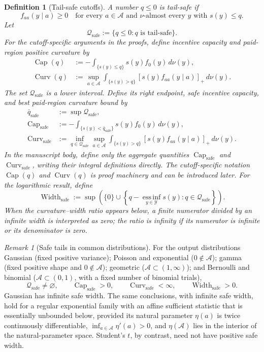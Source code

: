 \documentclass[11pt]{article}
\newtheorem{definition}{Definition}
\theoremstyle{remark}
\newtheorem{remark}{Remark}
\newcommand{\dd}{\,d\nu}
\newcommand{\cA}{\mathcal A}
\newcommand{\cY}{\mathcal Y}
\newcommand{\cQ}{\mathcal Q}
\DeclareMathOperator{\Capacity}{Cap}
\DeclareMathOperator{\Curv}{Curv}
\DeclareMathOperator{\Width}{Width}
\begin{document}
\begin{definition}[Tail-safe cutoffs]
A number $q\le0$ is \emph{tail-safe} if
\[
 f_{aa}(y\mid a)\ge0
 \quad\text{for every }a\in\cA
 \text{ and $\nu$-almost every }y\text{ with }s(y)\le q.
 \tag{TS}\label{eq:tail-safe}
\]
Let
\[
 \cQ_{\mathrm{safe}}:=\{q\le0:q\text{ is tail-safe}\}.
\]
For the cutoff-specific arguments in the proofs, define incentive capacity and
paid-region positive curvature by
\begin{align*}
 \Capacity(q)&:=-\int_{\{s(y)\le q\}}s(y)f_0(y)\dd(y),\\
 \Curv(q)&:=\sup_{a\in\cA}
 \int_{\{s(y)>q\}}[s(y)f_{aa}(y\mid a)]_+\dd(y).
\end{align*}
The set $\cQ_{\mathrm{safe}}$ is a lower interval.  Define its right endpoint,
safe incentive capacity, and best paid-region curvature bound by
\begin{align*}
 \bar q_{\mathrm{safe}}&:=\sup\cQ_{\mathrm{safe}},\\
 \Capacity_{\mathrm{safe}}
 &:=-\int_{\{s(y)<\bar q_{\mathrm{safe}}\}}s(y)f_0(y)\dd(y),\\
 \Curv_{\mathrm{safe}}
 &:=\inf_{q\in\cQ_{\mathrm{safe}}}\sup_{a\in\cA}
 \int_{\{s(y)>q\}}[s(y)f_{aa}(y\mid a)]_+\dd(y).
\end{align*}
In the manuscript body, define only the aggregate quantities
$\Capacity_{\mathrm{safe}}$ and $\Curv_{\mathrm{safe}}$, writing their integral
definitions directly.  The cutoff-specific notation $\Capacity(q)$ and
$\Curv(q)$ is proof machinery and can be introduced later.  For the logarithmic
result, define
\[
 \Width_{\mathrm{safe}}
 :=\sup\left(\{0\}\cup
 \left\{q-\operatorname*{ess\,inf}_{y\in\cY}s(y):
 q\in\cQ_{\mathrm{safe}}\right\}\right).
\]
When the curvature--width ratio appears below, a
finite numerator divided by an infinite width is interpreted as zero; the ratio
is infinity if its numerator is infinite or its denominator is zero.
\end{definition}

\begin{remark}[Safe tails in common distributions]
For the output distributions Gaussian (fixed positive variance); Poisson and exponential
($0\notin\cA$); gamma (fixed positive shape and $0\notin\cA$);
geometric ($\cA\subset(1,\infty)$); and Bernoulli and binomial
($\cA\subset(0,1)$, with a fixed number of binomial trials),
\[
 \cQ_{\mathrm{safe}}\neq\varnothing,
 \qquad \Capacity_{\mathrm{safe}}>0,
 \qquad \Curv_{\mathrm{safe}}<\infty,
 \qquad \Width_{\mathrm{safe}}>0.
\]
Gaussian has infinite safe width.  The same conclusions, with
infinite safe width, hold for a regular exponential family with an affine
sufficient statistic that is essentially unbounded below, provided its natural
parameter $\eta(a)$ is twice continuously differentiable,
$\inf_{a\in\cA}\eta'(a)>0$, and $\eta(\cA)$ lies in the interior of the
natural-parameter space.  Student's $t$, by contrast, need not have positive
safe width.
\end{remark}
\end{document}
